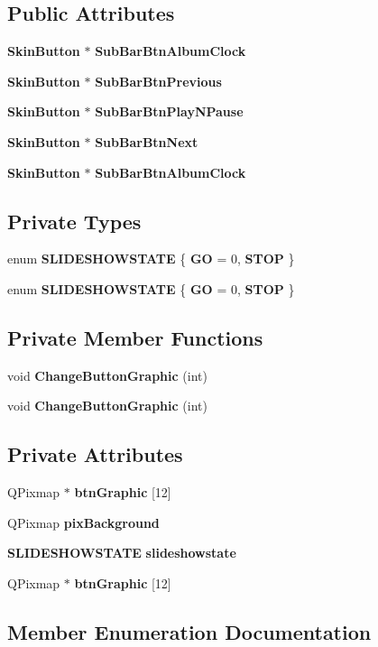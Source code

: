 \subsection*{Public Attributes}
\begin{CompactItemize}
\item 
{\bf Skin\-Button} $\ast$ {\bf Sub\-Bar\-Btn\-Album\-Clock}
\item 
{\bf Skin\-Button} $\ast$ {\bf Sub\-Bar\-Btn\-Previous}
\item 
{\bf Skin\-Button} $\ast$ {\bf Sub\-Bar\-Btn\-Play\-NPause}
\item 
{\bf Skin\-Button} $\ast$ {\bf Sub\-Bar\-Btn\-Next}
\item 
{\bf Skin\-Button} $\ast$ {\bf Sub\-Bar\-Btn\-Album\-Clock}
\end{CompactItemize}
\subsection*{Private Types}
\begin{CompactItemize}
\item 
enum {\bf SLIDESHOWSTATE} \{ {\bf GO} = 0, 
{\bf STOP}
 \}
\item 
enum {\bf SLIDESHOWSTATE} \{ {\bf GO} = 0, 
{\bf STOP}
 \}
\end{CompactItemize}
\subsection*{Private Member Functions}
\begin{CompactItemize}
\item 
void {\bf Change\-Button\-Graphic} (int)
\item 
void {\bf Change\-Button\-Graphic} (int)
\end{CompactItemize}
\subsection*{Private Attributes}
\begin{CompactItemize}
\item 
QPixmap $\ast$ {\bf btn\-Graphic} [12]
\item 
QPixmap {\bf pix\-Background}
\item 
{\bf SLIDESHOWSTATE} {\bf slideshowstate}
\item 
QPixmap $\ast$ {\bf btn\-Graphic} [12]
\end{CompactItemize}


\subsection{Member Enumeration Documentation}
